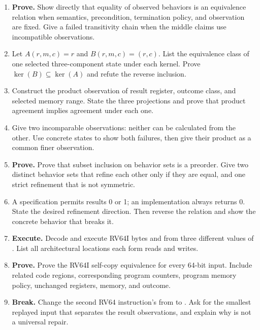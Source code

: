 \begin{enumerate}
\item \textbf{Prove.} Show directly that equality of observed behaviors is an
equivalence relation when semantics, precondition, termination policy, and
observation are fixed. Give a failed transitivity chain when the middle claims
use incompatible observations.

\item Let \(A(r,m,c)=r\) and \(B(r,m,c)=(r,c)\). List the equivalence class of
one selected three-component state under each kernel. Prove
\(\ker(B)\subseteq\ker(A)\) and refute the reverse inclusion.

\item Construct the product observation of result register, outcome class,
and selected memory range. State the three projections and prove that product
agreement implies agreement under each one.

\item Give two incomparable observations: neither can be calculated from the
other. Use concrete states to show both failures, then give their product as a
common finer observation.

\item \textbf{Prove.} Prove that subset inclusion on behavior sets is a
preorder. Give two distinct behavior sets that refine each other only if they
are equal, and one strict refinement that is not symmetric.

\item A specification permits results 0 or 1; an implementation always returns
0. State the desired refinement direction. Then reverse the relation and show
the concrete behavior that breaks it.

\item \textbf{Execute.} Decode and execute RV64I bytes
 and  from three different values of
. List all architectural locations each form reads and writes.

\item \textbf{Prove.} Prove the RV64I self-copy equivalence for every 64-bit
input. Include related code regions, corresponding program counters, program
memory policy, unchanged registers, memory, and outcome.

\item \textbf{Break.} Change the second RV64 instruction's  from
 to . Ask for the smallest replayed input that separates the
result observations, and explain why  is not a universal repair.


\end{enumerate}
